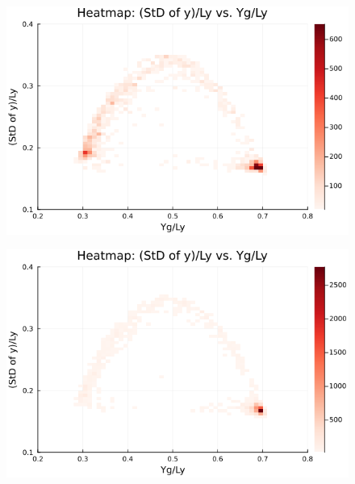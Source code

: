\begin{figure}[H]
  \centering
  \includegraphics[scale=0.6]{image/RaRtmap10_heat/2023-12-28T12:38:52.836_map_10times_chi1.265_Ay50_rho0.4_T0.43_dT0.04_Rd0.0_Rt0.5_Ra0.938769_g0.0003999718779659611_run4.0e8.png}
  \label{}
\end{figure}

\begin{figure}[H]
  \centering
  \includegraphics[scale=0.6]{image/RaRtmap10_heat/2023-12-28T12:38:52.911_map_10times_chi1.265_Ay50_rho0.4_T0.43_dT0.04_Rd0.0_Rt0.5_Ra1.4081535_g0.0003999718779659611_run4.0e8.png}
  \label{}
\end{figure}

